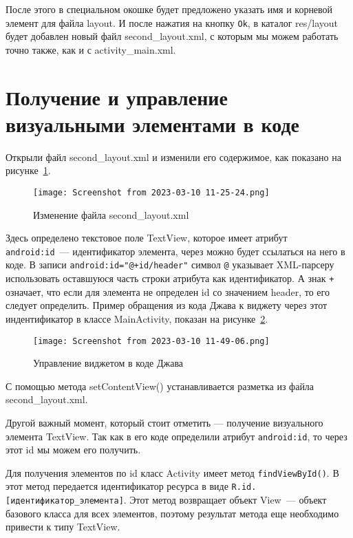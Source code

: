 После этого в специальном окошке будет предложено указать имя и
корневой элемент для файла layout. И после нажатия на кнопку \texttt{Ok},
в каталог res/layout будет добавлен новый файл second\_layout.xml,
с которым мы можем работать точно также, как и с activity\_main.xml.\par

\section{Получение и управление визуальными элементами в коде}
Открыли файл second\_layout.xml и изменили его содержимое, как показано
на рисунке~\ref{fig:xml:textview:d}.

\begin{figure}[h!tp]
	\centering
	\texttt{[image: Screenshot from 2023-03-10 11-25-24.png]}
	\caption{Изменение файла second\_layout.xml}
	\label{fig:xml:textview:d}
\end{figure}

Здесь определено текстовое поле TextView, которое имеет
атрибут \texttt{android:id}~--- идентификатор элемента,
через можно будет ссылаться на него в коде.
В записи \texttt{android:id="@+id/header"} символ
\texttt{@} указывает XML-парсеру использовать оставшуюся часть строки
атрибута как идентификатор. А знак \texttt{+} означает, что если для
элемента не определен id со значением header, то его следует
определить.
Пример обращения из кода Джава к виджету через этот индентификатор в
классе MainActivity, показан на рисунке~\ref{fig:java:textview:manage}.

\begin{figure}[h!tp]
	\centering
	\texttt{[image: Screenshot from 2023-03-10 11-49-06.png]}
	\caption{Управление виджетом в коде Джава}
	\label{fig:java:textview:manage}
\end{figure}

С помощью метода setContentView() устанавливается разметка из файла
second\_layout.xml.\par
Другой важный момент, который стоит отметить --- получение визуального
элемента TextView. Так как в его коде определили атрибут \texttt{android:id},
то через этот id мы можем его получить.\par
Для получения элементов по id класс Activity имеет метод
\texttt{findViewById()}. В этот метод передается идентификатор ресурса в виде
\texttt{R.id.[идентификатор\_элемента]}. Этот метод возвращает объект View~---
объект базового класса для всех элементов, поэтому результат метода еще
необходимо привести к типу TextView.

